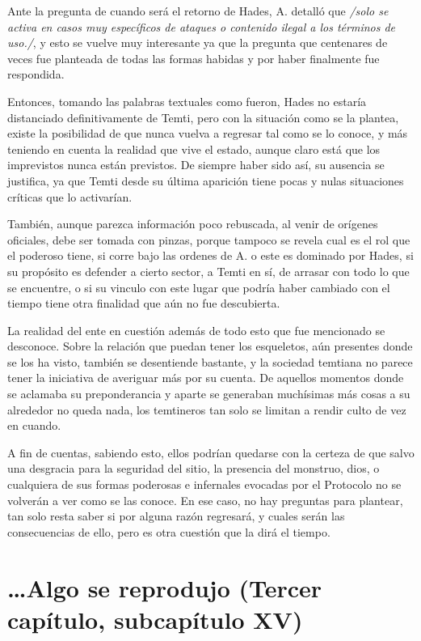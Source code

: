 \documentclass[
  spanish,
]{book}
\begin{document}
Ante la pregunta de cuando será el retorno de Hades, A. detalló que \emph{/solo se activa en casos muy específicos de ataques o contenido ilegal a los términos de uso./}, y esto se vuelve muy interesante ya que la pregunta que centenares de veces fue planteada de todas las formas habidas y por haber finalmente fue respondida.

Entonces, tomando las palabras textuales como fueron, Hades no estaría distanciado definitivamente de Temti, pero con la situación como se la plantea, existe la posibilidad de que nunca vuelva a regresar tal como se lo conoce, y más teniendo en cuenta la realidad que vive el estado, aunque claro está que los imprevistos nunca están previstos. De siempre haber sido así, su ausencia se justifica, ya que Temti desde su última aparición tiene pocas y nulas situaciones críticas que lo activarían.

También, aunque parezca información poco rebuscada, al venir de orígenes oficiales, debe ser tomada con pinzas, porque tampoco se revela cual es el rol que el poderoso tiene, si corre bajo las ordenes de A. o este es dominado por Hades, si su propósito es defender a cierto sector, a Temti en sí, de arrasar con todo lo que se encuentre, o si su vinculo con este lugar que podría haber cambiado con el tiempo tiene otra finalidad que aún no fue descubierta.

La realidad del ente en cuestión además de todo esto que fue mencionado se desconoce. Sobre la relación que puedan tener los esqueletos, aún presentes donde se los ha visto, también se desentiende bastante, y la sociedad temtiana no parece tener la iniciativa de averiguar más por su cuenta. De aquellos momentos donde se aclamaba su preponderancia y aparte se generaban muchísimas más cosas a su alrededor no queda nada, los temtineros tan solo se limitan a rendir culto de vez en cuando.

A fin de cuentas, sabiendo esto, ellos podrían quedarse con la certeza de que salvo una desgracia para la seguridad del sitio, la presencia del monstruo, dios, o cualquiera de sus formas poderosas e infernales evocadas por el Protocolo no se volverán a ver como se las conoce. En ese caso, no hay preguntas para plantear, tan solo resta saber si por alguna razón regresará, y cuales serán las consecuencias de ello, pero es otra cuestión que la dirá el tiempo.

\hypertarget{algo-se-reprodujo-tercer-capuxedtulo-subcapuxedtulo-xv}{%
\section{\ldots Algo se reprodujo (Tercer capítulo, subcapítulo XV)}\label{algo-se-reprodujo-tercer-capuxedtulo-subcapuxedtulo-xv}}
\end{document}
